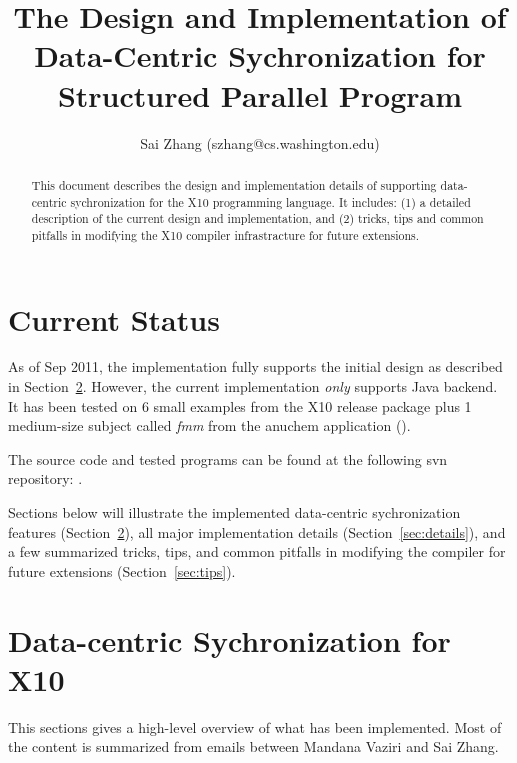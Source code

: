 \documentclass{article}
\begin{document}
\title{The Design and Implementation of Data-Centric Sychronization for Structured Parallel Program}
\author{Sai Zhang (szhang@cs.washington.edu)}

\maketitle

\begin{abstract}
This document describes the design and implementation details of supporting data-centric sychronization for the X10 programming language. It includes: (1) a detailed description of the current design and implementation, and (2) tricks, tips and common pitfalls in modifying the X10 compiler infrastracture for future extensions.
\end{abstract}

\section{Current Status}

As of Sep 2011, the implementation fully supports the initial design as described in Section~\ref{sec:design}. However, the current implementation 
 \textit{only} supports Java backend. It has been tested on 6 small examples from the X10 release package plus 1 medium-size subject called \textit{fmm} from the anuchem application ().

The source code and tested programs can be found at the following svn repository: .  


Sections below will illustrate the implemented data-centric sychronization features (Section~\ref{sec:design}),  all major implementation details (Section~\ref{sec:details}), and a few summarized tricks, tips, and common pitfalls in modifying the compiler for future extensions (Section~\ref{sec:tips}).

\section{Data-centric Sychronization for X10}
\label{sec:design}

This sections gives a high-level overview of what has been implemented. Most of the content is summarized from emails between Mandana Vaziri and Sai Zhang.
\end{document}

